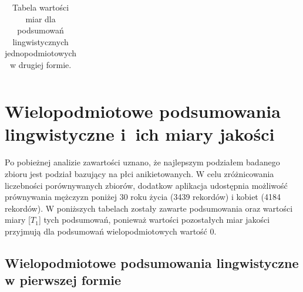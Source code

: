 \documentclass{classrep}
\begin{document}
\begin{center}
\begin{table}[H]
\begin{adjustbox}{center=11cm}
\begin{tabularx}{\textwidth}{ccccccccccccc}
  \end{tabularx}
  \end{adjustbox}
  \caption{Tabela wartości miar dla podsumowań lingwistycznych jednopodmiotowych w drugiej formie.}
\end{table}
\end{center}
 
% 
% 
\section{Wielopodmiotowe podsumowania lingwistyczne i~ich miary jakości} 

Po pobieżnej analizie zawartości uznano, że najlepszym podziałem badanego zbioru \cite{database} jest podział bazujący na płci 
anikietowanych. W celu zróżnicowania liczebności porównywanych zbiorów, dodatkow aplikacja udostępnia możliwość
prównywania mężczyzn poniżej 30 roku życia (3439 rekordów) i kobiet (4184 rekordów).
W poniższych tabelach zostały zawarte podsumowania oraz wartości miary [$T_1$] tych podsumowań, ponieważ wartości pozostałych miar jakości przyjmują dla podsumowań wielopodmiotowych wartość 0.

\subsection{Wielopodmiotowe podsumowania lingwistyczne w pierwszej formie}
\end{document}
